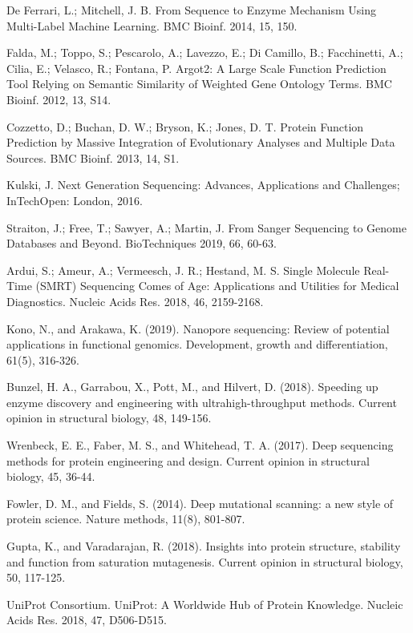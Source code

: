\documentclass[12pt]{article}
\begin{document}
\begin{thebibliography}{99}
 De Ferrari, L.; Mitchell, J. B. From Sequence to Enzyme Mechanism Using Multi-Label Machine Learning. BMC Bioinf. 2014, 15, 150.

 Falda, M.; Toppo, S.; Pescarolo, A.; Lavezzo, E.; Di Camillo, B.; Facchinetti, A.; Cilia, E.; Velasco, R.; Fontana, P. Argot2: A Large Scale Function Prediction Tool Relying on Semantic Similarity of Weighted Gene Ontology Terms. BMC Bioinf. 2012, 13, S14.

 Cozzetto, D.; Buchan, D. W.; Bryson, K.; Jones, D. T. Protein Function Prediction by Massive Integration of Evolutionary Analyses and Multiple Data Sources. BMC Bioinf. 2013, 14, S1.

 Kulski, J. Next Generation Sequencing: Advances, Applications and Challenges; InTechOpen: London, 2016.

 Straiton, J.; Free, T.; Sawyer, A.; Martin, J. From Sanger Sequencing to Genome Databases and Beyond. BioTechniques 2019, 66, 60-63.

 Ardui, S.; Ameur, A.; Vermeesch, J. R.; Hestand, M. S. Single Molecule Real-Time (SMRT) Sequencing Comes of Age: Applications and Utilities for Medical Diagnostics. Nucleic Acids Res. 2018, 46, 2159-2168.

Kono, N., and Arakawa, K. (2019). Nanopore sequencing: Review of potential applications in functional genomics. Development, growth and differentiation, 61(5), 316-326.

 Bunzel, H. A., Garrabou, X., Pott, M., and Hilvert, D. (2018). Speeding up enzyme discovery and engineering with ultrahigh-throughput methods. Current opinion in structural biology, 48, 149-156.

 Wrenbeck, E. E., Faber, M. S., and Whitehead, T. A. (2017). Deep sequencing methods for protein engineering and design. Current opinion in structural biology, 45, 36-44.

 Fowler, D. M., and Fields, S. (2014). Deep mutational scanning: a new style of protein science. Nature methods, 11(8), 801-807.

 Gupta, K., and Varadarajan, R. (2018). Insights into protein structure, stability and function from saturation mutagenesis. Current opinion in structural biology, 50, 117-125.

 UniProt Consortium. UniProt: A Worldwide Hub of Protein Knowledge. Nucleic Acids Res. 2018, 47, D506-D515.


\end{thebibliography}
\end{document}
